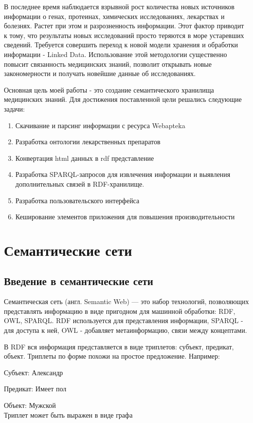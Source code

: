 \documentclass[specialist,subf,href,colorlinks=true
]{disser}
\begin{document}
\tableofcontents %
\intro
В последнее время наблюдается взрывной рост количества новых источников информации о генах, протеинах, химических исследованиях, лекарствах и болезнях. Растет при этом и разрозненность информации. Этот фактор приводит к тому, что результаты новых исследований просто теряются в море устаревших сведений.
Требуется совершить переход к новой модели хранения и обработки информации - Linked Data. Использование этой методологии существенно повысит связанность медицинских знаний, позволит открывать новые закономерности и получать новейшие данные об исследованиях.

Основная цель моей работы - это создание семантического хранилища медицинских знаний.
Для достижения поставленной цели решались следующие задачи:
\begin{enumerate}
\item Скачивание и парсинг информации с ресурса Webapteka
\item Разработка онтологии лекарственных препаратов
\item Конвертация html данных в rdf представление
\item Разработка SPARQL-запросов для извлечения информации и выявления дополнительных связей в RDF-хранилище.
\item Разработка пользовательского интерфейса
\item Кеширование элементов приложения для повышения производительности
\end{enumerate}

\chapter{Семантические сети}
\section{Введение в семантические сети}

Семантическая сеть (англ. Semantic Web) — это набор технологий, позволяющих представлять информацию в виде пригодном для машинной обработки: RDF, OWL, SPARQL. RDF используется для представления информации, SPARQL - для доступа к ней, OWL - добавляет метаинформацию, связи между концептами.

В RDF вся информация представляется в виде триплетов: субъект, предикат, объект. Триплеты по форме похожи на простое предложение.  Например:
\par Субъект: Александр
\par Предикат: Имеет пол
\par Объект: Мужской
\\Триплет может быть выражен в виде графа
\\
\par {}
\end{document}
